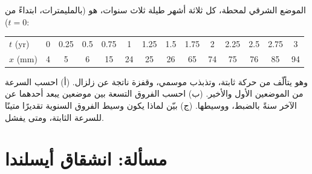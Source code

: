 \begin{exercise}[$\star\star\star$]\label{exo:b1:plate-kinematics:12}
الموضع الشرقي لمحطة، كل ثلاثة أشهر طيلة ثلاث سنوات، هو (بالمليمترات، ابتداءً من $t = 0$):
\begin{center}\small
\begin{tabular}{l*{13}{c}}
\hline
$t$ (yr) & 0 & 0.25 & 0.5 & 0.75 & 1 & 1.25 & 1.5 & 1.75 & 2 & 2.25 & 2.5 & 2.75 & 3\\
$x$ (mm) & 4 & 5 & 6 & 15 & 24 & 25 & 26 & 65 & 74 & 75 & 76 & 85 & 94\\
\hline
\end{tabular}
\end{center}
وهو يتألّف من حركة ثابتة، وتذبذب موسمي، وقفزة ناتجة عن زلزال. (أ) احسب السرعة من الموضعين الأول والأخير. (ب) احسب الفروق التسعة بين موضعين يبعد أحدهما عن الآخر سنةً بالضبط، ووسيطها. (ج) بيّن لماذا يكون وسيط الفروق السنوية تقديرًا متينًا للسرعة الثابتة، ومتى يفشل.
\end{exercise}

\section{مسألة: انشقاق أيسلندا}

